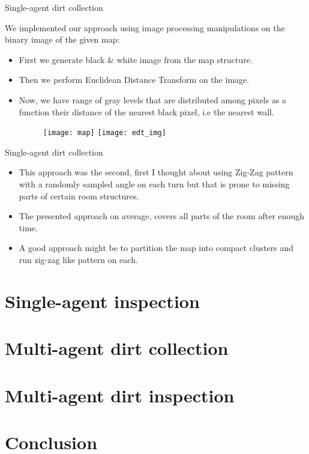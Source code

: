 \documentclass[10pt]{beamer}
\begin{document}
\begin{frame}{Single-agent dirt collection}

We implemented our approach using image processing manipulations on the binary image of the given map:
\graphicspath{{images/}}
\begin{itemize}
    \item First we generate black & white image from the map structure.
    \item Then we perform Euclidean Distance Transform on the image.
    \item Now, we have range of gray levels that are distributed among pixels as a function their distance of the nearest black pixel, i.e the nearest wall.
    \bigskip
    
    \begin{figure}[htp]
    \centering
    \texttt{[image: map]}
    \texttt{[image: edt\_img]}

    \label{fig:galaxy}
\end{figure}
    
\end{itemize}



\end{frame}

\begin{frame}{Single-agent dirt collection}

\begin{itemize}
    \item This approach was the second, first I thought about using Zig-Zag pattern with a randomly sampled angle on each turn but that is prone to missing parts of certain room structures.
    \item The presented approach on average, covers all parts of the room after enough time.
    \item A good approach might be to partition the map into compact clusters and run zig-zag like pattern on each.
\end{itemize}

\end{frame}


\section{Single-agent inspection}

\section{Multi-agent dirt collection}

\section{Multi-agent dirt inspection}

\section{Conclusion}
\end{document}
